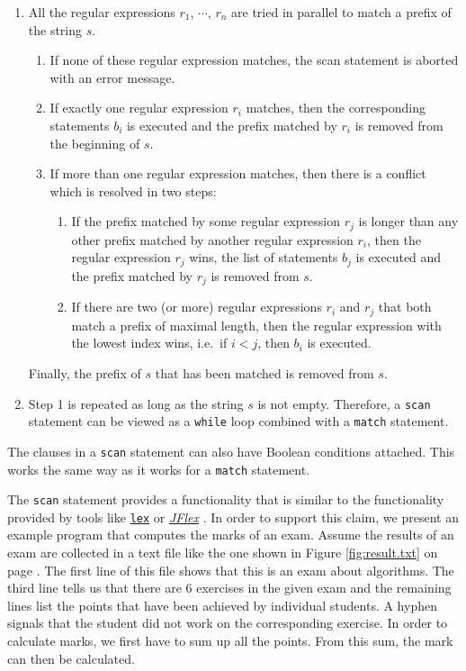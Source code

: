\begin{enumerate}
\item All the regular expressions $r_1$, $\cdots$, $r_n$ are tried in parallel to match a
      prefix of the string $s$.
      \begin{enumerate}
      \item If none of these regular expression matches, the scan statement is aborted
            with an error message.
      \item If exactly one regular expression $r_i$ matches, then the corresponding
            statements $b_i$ is executed and the prefix matched by $r_i$ is removed from
            the beginning of $s$.
      \item If more than one regular expression matches, then there is a conflict which
            is resolved in two steps:
            \begin{enumerate}
            \item If the prefix matched by some regular expression $r_j$ is longer
                  than any other prefix matched by another regular expression $r_i$,
                  then the regular expression $r_j$ wins, the list of statements $b_j$ is
                  executed and the prefix matched by $r_j$ is removed from $s$.
            \item If there are two (or more) regular expressions $r_i$ and $r_j$ that both
                  match a prefix of maximal length, then the regular expression with the
                  lowest index wins, i.e.~if $i < j$, then $b_i$ is executed.
            \end{enumerate}
      \end{enumerate}
      Finally, the prefix of $s$ that has been matched is removed from $s$.
\item Step 1 is repeated as long as the string $s$ is not empty.  Therefore, a \texttt{scan}
      statement can be viewed as a \texttt{while} loop combined with a \texttt{match} statement.
\end{enumerate}
The clauses in a \texttt{scan} statement can also have Boolean conditions attached.  This
works the same way as it works for a \texttt{match} statement.

The \texttt{scan} statement provides a functionality that is similar to the functionality
provided  by tools like 
\href{http://en.wikipedia.org/wiki/Lex_(software)}{\texttt{lex}} \cite{lesk:1975} or
\href{http://jflex.de}{\textsl{JFlex}} \cite{klein:2009}. 
In order to support this claim, we present an example program that computes the marks of
an exam.  Assume the results of an exam are collected in a text file like the one shown in
Figure \ref{fig:result.txt} on page \pageref{fig:result.txt}.  The first line of this file shows that this is an exam about
algorithms.  The third line tells us
that there are 6 exercises in the given exam and the remaining lines list the points that
have been achieved by individual students.  A hyphen signals that the student did not work
on the corresponding exercise.  In order to calculate marks, we first have to sum up all the points.
From this sum, the mark can then be calculated.

